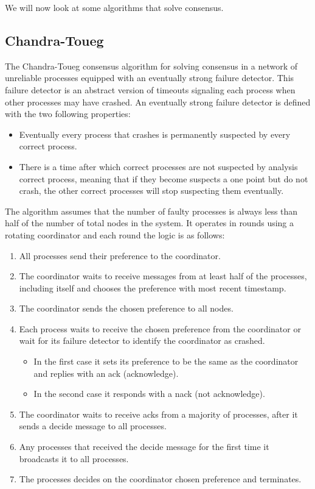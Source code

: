 We will now look at some algorithms that solve consensus.

\subsection{Chandra-Toueg}
\label{sub:chandra-toueg}

The Chandra-Toueg consensus algorithm \cite{chandra} for solving consensus in a network of
unreliable processes equipped with an eventually strong failure detector.
This failure detector is an abstract version of timeouts signaling each
process when other processes may have crashed.
An eventually strong failure detector is defined with the two following properties:
\begin{itemize}
  \item Eventually every process that crashes is permanently suspected by every
correct process.
  \item There is a time after which correct processes are not suspected by analysis
correct process, meaning that if they become suspects a one point but do not crash,
the other correct processes will stop suspecting them eventually.
\end{itemize}

The algorithm assumes that the number of faulty processes is always less than half
of the number of total nodes in the system. It operates in rounds using a rotating
coordinator and each round the logic is as follows:

\begin{enumerate}
  \item All processes send their preference to the coordinator.
  \item The coordinator waits to receive messages from at least half of the processes,
including itself and chooses the preference with most recent timestamp.
  \item The coordinator sends the chosen preference to all nodes.
  \item Each process waits to receive the chosen preference from the coordinator
or wait for its failure detector to identify the coordinator as crashed.
  \begin{itemize}
    \item In the first case it sets its preference to be the same as the coordinator
and replies with an ack (acknowledge).
    \item In the second case it responds with a nack (not acknowledge).
  \end{itemize}
  \item The coordinator waits to receive acks from a majority of processes, after
it sends a decide message to all processes.
  \item Any processes that received the decide message for the first time it
broadcasts it to all processes.
  \item The processes decides on the coordinator chosen preference and terminates.
\end{enumerate}

